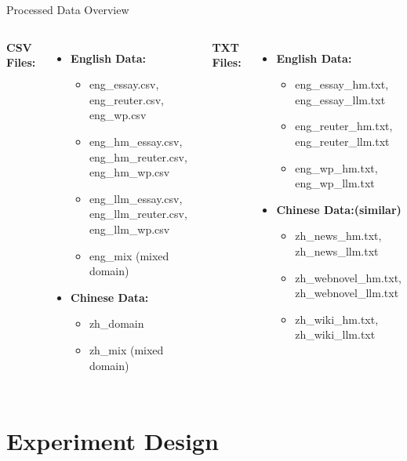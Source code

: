 \documentclass[serif]{beamer}
\begin{document}
\begin{frame}{Processed Data Overview}
\begin{columns}[t]

\textbf{CSV Files:}
\begin{itemize}
  \item \textbf{English Data:}
  \begin{itemize}
    \item eng\_essay.csv, eng\_reuter.csv, eng\_wp.csv
    \item eng\_hm\_essay.csv, eng\_hm\_reuter.csv, eng\_hm\_wp.csv
    \item eng\_llm\_essay.csv, eng\_llm\_reuter.csv, eng\_llm\_wp.csv
    \item eng\_mix (mixed domain)
  \end{itemize}
  \item \textbf{Chinese Data:}
  \begin{itemize}
    \item zh\_domain
    \item zh\_mix (mixed domain)
  \end{itemize}
\end{itemize}

\textbf{TXT Files:}
\begin{itemize}
  \item \textbf{English Data:}
  \begin{itemize}
    \item eng\_essay\_hm.txt, eng\_essay\_llm.txt
    \item eng\_reuter\_hm.txt, eng\_reuter\_llm.txt
    \item eng\_wp\_hm.txt, eng\_wp\_llm.txt
  \end{itemize}
  \item \textbf{Chinese Data:(similar)}
  \begin{itemize}
    \item zh\_news\_hm.txt, zh\_news\_llm.txt
    \item zh\_webnovel\_hm.txt, zh\_webnovel\_llm.txt
    \item zh\_wiki\_hm.txt, zh\_wiki\_llm.txt
  \end{itemize}
\end{itemize}

\end{columns}
\end{frame}



\section{Experiment Design}
\end{document}
